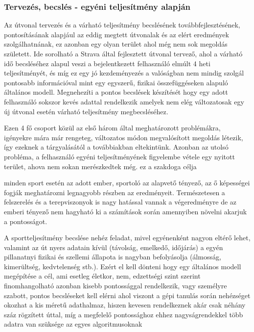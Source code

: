 \subsubsection{Tervezés, becslés - egyéni teljesítmény alapján} 
Az útvonal tervezés és a várható teljesítmény becslésének továbbfejlesztésének, pontosításának alapjául az eddig megtett útvonalak és az elért eredmények szolgálhatnának, ez azonban egy olyan terület ahol még nem sok megoldás született. Ide sorolható a Strava által fejlesztett útvonal tervező, ahol a várható idő becsléséhez alapul veszi a bejelentkezett felhasználó elmúlt 4 heti teljesítményét, és míg ez egy jó kezdeményezés a valóságban nem mindig szolgál pontosabb információval mint egy egyszerű, fizikai összefüggéseken alapuló általános modell. Megnehezíti a pontos becslések készítését hogy egy adott felhasználó sokszor kevés adattal rendelkezik amelyek nem elég változatosak egy új útvonal esetén várható teljesítmény megbecsléséhez.


Ezen 4 fő csoport közül az első három által meghatározott problémákra, igényekre mára már rengeteg, változatos módon megvalósított megoldás létezik, így ezeknek a tárgyalásától a továbbiakban eltekintünk. Azonban az utolsó probléma, a felhasználó egyéni teljesítményének figyelembe vétele egy nyitott terület, ahova nem sokan merészkedtek még. \TODO ez a szakdoga célja  
 


 minden sport esetén az adott ember, sportoló az alapvető tényező, az ő képességei fogják meghatározni legnagyobb részben az eredményeit. Természetesen a felszerelés és a terepviszonyok is nagy hatással vannak a végeredményre de az emberi tényező nem hagyható ki a számítások során amennyiben növelni akarjuk a pontosságot.




A sportteljesítmény becslése nehéz feladat, mivel egyénenként nagyon eltérő lehet, valamint az út nyers adatain kívül (távolság, emelkedő, időjárás) a egyén pillanatnyi fizikai és szellemi állapota is nagyban befolyásolja (álmosság, kimerültség, kedvtelenség stb.). Ezért el kell dönteni hogy egy általános modell megépítése a cél, ami esetleg életkor, nem, edzettségi szint szerint finomhangolható azonban kisebb pontossággal rendelkezik, vagy személyre szabott, pontos becsléseket kell elérni ahol viszont a gépi tanulás során nehézséget okozhat a kis méretű adathalmaz, hiszen kevesen rendelkeznek akár csak néhány száz rögzített úttal, míg a megfelelő pontossághoz ehhez nagyságrendekkel több adatra van szüksége az egyes algoritmusoknak




